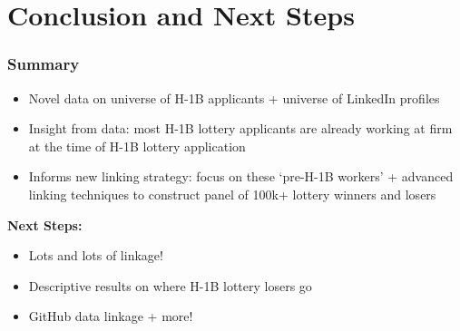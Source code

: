 \documentclass[xcolor=dvipsnames, compress, 12pt, aspectratio=169, handout]{beamer}
\begin{document}
\section{Conclusion and Next Steps}
\begin{frame}
    \frametitle{Summary}
    \begin{itemize}
        \item Novel data on universe of H-1B applicants + universe of LinkedIn profiles 
        \vspace{3mm}
        \item Insight from data: most H-1B lottery applicants are already working at firm at the time of H-1B lottery application 
        \vspace{3mm}
        \item Informs new linking strategy: focus on these `pre-H-1B workers' + advanced linking techniques to construct panel of 100k+ lottery winners and losers 
    \end{itemize}
    \vspace{2mm}
    \textbf{Next Steps:}
    \begin{itemize}
        \item Lots and lots of linkage! 
        \vspace{1mm}
        \item Descriptive results on where H-1B lottery losers go
        \vspace{1mm}
        \item GitHub data linkage + more!
    \end{itemize}
\end{frame}


\end{document}
